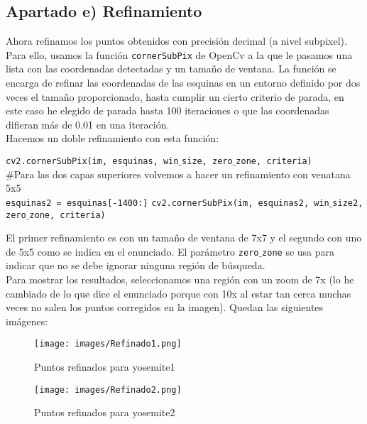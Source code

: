 \documentclass[12pt]{article}
\begin{document}
\subsection*{Apartado e) Refinamiento}
Ahora refinamos los puntos obtenidos con precisión decimal (a nivel subpixel). Para ello, usamos la función \texttt{cornerSubPix} de OpenCv a la que le pasamos una lista con las coordenadas detectadas y un tamaño de ventana. La función se encarga de refinar las coordenadas de las esquinas en un entorno definido por dos veces el tamaño proporcionado, hasta cumplir un cierto criterio de parada, en este caso he elegido de parada hasta 100 iteraciones o que las coordenadas difieran más de 0.01 en una iteración.\\
Hacemos un doble refinamiento con esta función:
\begin{center}
\texttt{cv2.cornerSubPix(im, esquinas, win$\_$size, zero$\_$zone, criteria)}\\
$\#$Para las dos capas superiores volvemos a hacer un refinamiento con venatana 5x5\\
\texttt{esquinas2 = esquinas[-1400:]}
\texttt{cv2.cornerSubPix(im, esquinas2, win$\_$size2, zero$\_$zone, criteria)}
\end{center}
El primer refinamiento es con un tamaño de ventana de 7x7 y el segundo con uno de 5x5 como se indica en el enunciado. El parámetro \texttt{zero$\_$zone} se usa para indicar que no se debe ignorar ninguna región de búsqueda.\\
Para mostrar los resultados, seleccionamos una región con un zoom de 7x (lo he cambiado de lo que dice el enunciado porque con 10x al estar tan cerca muchas veces no salen los puntos corregidos en la imagen). Quedan las siguientes imágenes:\\
\begin{figure}[H]
\centering
\parbox{8cm}{
\texttt{[image: images/Refinado1.png]}
\caption{Puntos refinados para yosemite1}
\label{fig:2figsA}}
\begin{minipage}{8cm}
\texttt{[image: images/Refinado2.png]}
\caption{Puntos refinados para yosemite2}
\label{fig:2figsB}
\end{minipage}
\end{figure}
\end{document}
